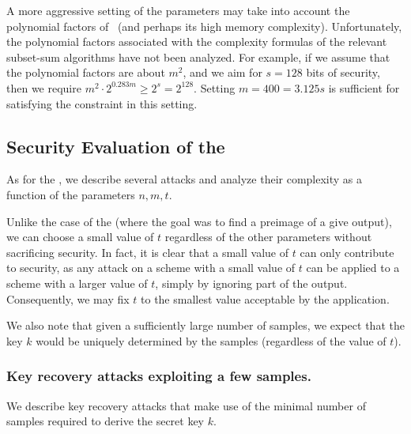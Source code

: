 A more aggressive setting of the parameters may take into account the polynomial factors of~\cite{BonnetainBSS20} (and perhaps its high memory complexity). Unfortunately, the polynomial factors associated with the complexity formulas of the relevant subset-sum algorithms have not been analyzed.
For example, if we assume that the polynomial factors are about $m^2$, and we aim for $s = 128$ bits of security, then
we require $m^2 \cdot 2^{0.283m} \geq 2^{s} = 2^{128}$. Setting $m = 400 = 3.125 s$ is sufficient for satisfying the constraint in this setting.






\subsection{Security Evaluation of the \ttwPRF}
\label{sec:basicprf}

As for the \ttOWF, we describe several attacks and analyze their complexity as a function of the parameters $n,m,t$.

Unlike the case of the \ttOWF (where the goal was to find a preimage of a give output),
we can choose a small value of $t$ regardless of the other parameters without sacrificing security. In fact, it is clear that a small value of $t$ can only contribute to security, as any attack on a scheme with a small value of $t$ can be applied to a scheme with a larger value of $t$, simply by ignoring part of the output. Consequently, we may fix $t$ to the smallest value acceptable by the application.

We also note that given a sufficiently large number of samples, we expect that the key $k$ would be uniquely determined by the samples (regardless of the value of $t$).

\subsubsection{Key recovery attacks exploiting a few samples.}
We describe key recovery attacks that make use of the minimal number of samples required to derive the secret key $k$.

